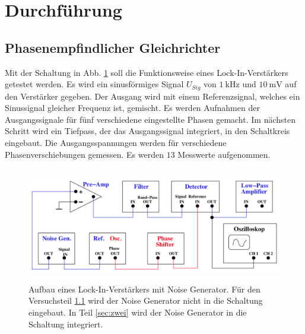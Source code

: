 \section{Durchführung}
\label{sec:Durchführung}


\subsection{Phasenempfindlicher Gleichrichter} %
\label{sec:eins}
Mit der Schaltung in Abb. \ref{lockin2} soll die Funktionsweise eines Lock-In-Verstärkers getestet werden.
Es wird ein sinusförmiges Signal $U_{Sig}$ von $\SI{1}{\kilo\hertz}$ und 
$\SI{10}{\milli\volt}$ auf den Verstärker gegeben.
Der Ausgang wird mit einem Referenzsignal, welches ein Sinussignal gleicher Frequenz ist, gemischt.
Es werden Aufnahmen der Ausgangssignale für fünf verschiedene eingestellte Phasen gemacht.
\newline
Im nächsten Schritt wird ein Tiefpass, der das Ausgangssignal integriert, 
in den Schaltkreis eingebaut. %
Die Ausgangsspannungen werden für verschiedene Phasenverschiebungen gemessen.
Es werden $\num{13}$ Messwerte aufgenommen. %
\begin{figure}
    \centering
    \includegraphics[width=12cm, height=5cm]{build/lockin2.png}
    \caption{Aufbau eines Lock-In-Verstärkers mit Noise Generator.
    Für den Versuchsteil \ref{sec:eins} wird der Noise Generator nicht in die 
    Schaltung eingebaut. In Teil \ref{sec:zwei} wird der Noise Generator in die 
    Schaltung integriert.}
    \label{lockin2}
\end{figure}

